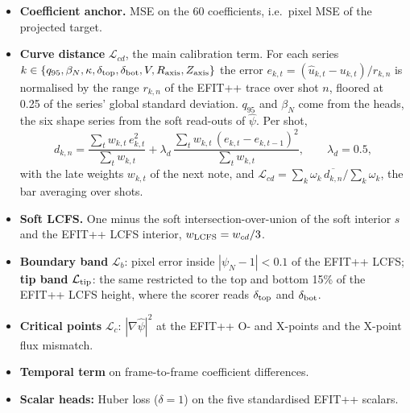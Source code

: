 \documentclass[11pt,a4paper]{article}
\numberwithin{equation}{section}
\begin{document}
\begin{itemize}
\item
  \textbf{Coefficient anchor.} MSE on the 60 coefficients, i.e.~pixel MSE of the projected target.
\item
  \textbf{Curve distance} \(\mathcal L_{cd}\), the main calibration term. For each series \(k\in\{q_{95},\beta_N,\kappa,\delta_{\rm top},\delta_{\rm bot},V,R_{\rm axis},Z_{\rm axis}\}\) the error \(e_{k,t}=(\hat u_{k,t}-u_{k,t})/r_{k,n}\) is normalised by the range \(r_{k,n}\) of the EFIT++ trace over shot \(n\), floored at 0.25 of the series' global standard deviation. \(q_{95}\) and \(\beta_N\) come from the heads, the six shape series from the soft read-outs of \(\hat\psi\). Per shot, \[
  d_{k,n} = \frac{\sum_t w_{k,t}\,e_{k,t}^2}{\sum_t w_{k,t}}
  + \lambda_d\,\frac{\sum_t w_{k,t}\,(e_{k,t}-e_{k,t-1})^2}{\sum_t w_{k,t}},\qquad \lambda_d=0.5,
  \] with the late weights \(w_{k,t}\) of the next note, and \(\mathcal L_{cd}=\sum_k\omega_k\,\overline{d_{k,n}}\big/\sum_k\omega_k\), the bar averaging over shots.
\item
  \textbf{Soft LCFS.} One minus the soft intersection-over-union of the soft interior \(s\) and the EFIT++ LCFS interior, \(w_{\rm LCFS}=w_{cd}/3\).
\item
  \textbf{Boundary band} \(\mathcal L_b\): pixel error inside \(|\psi_N-1|<0.1\) of the EFIT++ LCFS; \textbf{tip band} \(\mathcal L_{\rm tip}\): the same restricted to the top and bottom 15\% of the EFIT++ LCFS height, where the scorer reads \(\delta_{\rm top}\) and \(\delta_{\rm bot}\).
\item
  \textbf{Critical points} \(\mathcal L_c\): \(|\nabla\hat\psi|^2\) at the EFIT++ O- and X-points and the X-point flux mismatch.
\item
  \textbf{Temporal term} on frame-to-frame coefficient differences.
\item
  \textbf{Scalar heads:} Huber loss (\(\delta=1\)) on the five standardised EFIT++ scalars.
\end{itemize}
\end{document}
